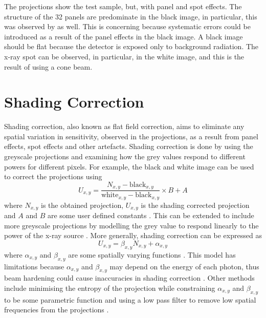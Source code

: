 The projections show the test sample, but, with panel and spot effects. The structure of the 32 panels are predominate in the black image, in particular, this was observed by \cite{yang2009evaluation} as well. This is concerning because systematic errors could be introduced as a result of the panel effects in the black image. A black image should be flat because the detector is exposed only to background radiation. The x-ray spot can be observed, in particular, in the white image, and this is the result of using a cone beam.

\afterpage{\clearpage}

\section{Shading Correction}

Shading correction, also known as flat field correction, aims to eliminate any spatial variation in sensitivity, observed in the projections, as a result from panel effects, spot effects and other artefacts. Shading correction is done by using the greyscale projections and examining how the grey values respond to different powers for different pixels. For example, the black and white image can be used to correct the projections using
\begin{equation}
U_{x,y} = \dfrac{N_{x,y}-\text{black}_{x,y}}{\text{white}_{x,y}-\text{black}_{x,y}}\times B+A
\label{eq:data_shadingCorrectionOld}
\end{equation}
where $N_{x,y}$ is the obtained projection, $U_{x,y}$ is the shading corrected projection and $A$ and $B$ are some user defined constants \citep{young2000shading, munzenmayer2003enhancing}. This can be extended to include more greyscale projections by modelling the grey value to respond linearly to the power of the x-ray source \citep{seibert1998flat}. More generally, shading correction can be expressed as
\begin{equation}
U_{x,y} = \beta_{x,y} N_{x,y} + \alpha_{x,y}
\end{equation}
where $\alpha_{x,y}$ and $\beta_{x,y}$ are some spatially varying functions \citep{munzenmayer2003enhancing}. This model has limitations because $\alpha_{x,y}$ and $\beta_{x,y}$ may depend on the energy of each photon, thus beam hardening could cause inaccuracies in shading correction \citep{davidson2003limitations}. Other methods include minimising the entropy of the projection while constraining $\alpha_{x,y}$ and $\beta_{x,y}$ to be some parametric function \citep{likar2000retrospective} and using a low pass filter to remove low spatial frequencies from the projections \citep{young2000shading, munzenmayer2003enhancing}.

